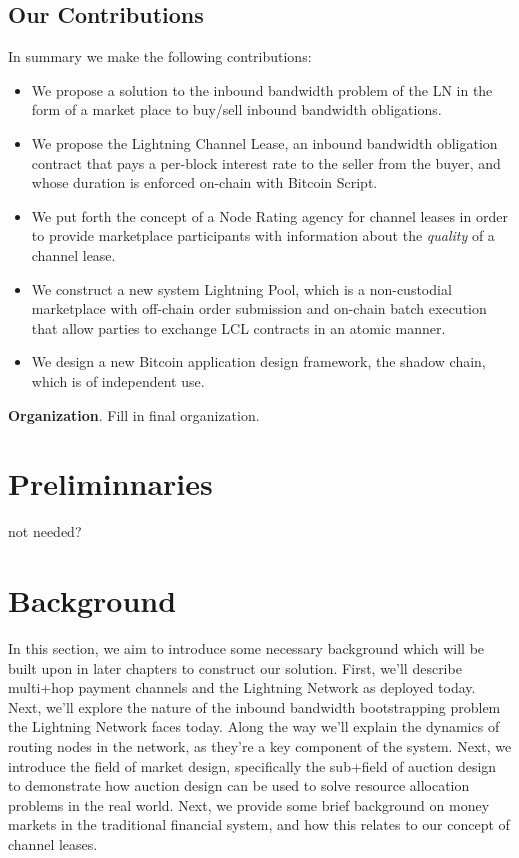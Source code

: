 \documentclass[12pt,a4paper]{article}
\theoremstyle{definition}
\begin{document}
\subsection{Our Contributions}

In summary we make the following contributions: \begin{itemize} \item We
        propose a solution to the inbound bandwidth problem of the LN in the
        form of a market place to buy/sell inbound bandwidth obligations.
    \item We propose the Lightning Channel Lease, an inbound bandwidth
        obligation contract that pays a per-block interest rate to the seller
        from the buyer, and whose duration is enforced on-chain with Bitcoin
        Script.  \item We put forth the concept of a Node Rating agency for
        channel leases in order to provide marketplace participants with
        information about the \emph{quality} of a channel lease.  \item We
        construct a new system Lightning Pool, which is a non-custodial
        marketplace with off-chain order submission and on-chain batch
        execution that allow parties to exchange LCL contracts in an atomic
        manner.  \item We design a new Bitcoin application design framework,
the shadow chain, which is of independent use.  \end{itemize}


 \textbf{Organization}. Fill in final organization.


\section{Preliminnaries}

not needed?



\section{Background}

In this section, we aim to introduce some necessary background which will be
built upon in later chapters to construct our solution. First, we'll describe
multi+hop payment channels and the Lightning Network as deployed today. Next,
we'll explore the nature of the inbound bandwidth bootstrapping problem the
Lightning Network faces today. Along the way we'll explain the dynamics of
routing nodes in the network, as they're a key component of the system. Next,
we introduce the field of market design, specifically the sub+field of auction
design to demonstrate how auction design can be used to solve resource
allocation problems in the real world. Next, we provide some brief background
on money markets in the traditional financial system, and how this relates to
our concept of channel leases.
\end{document}
